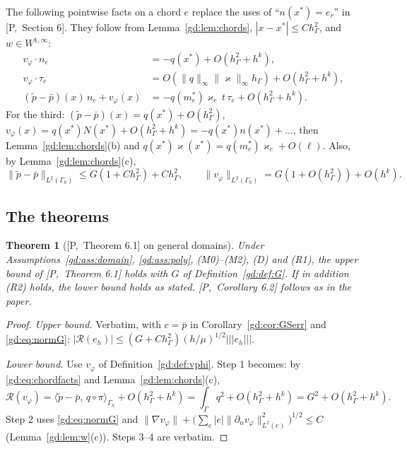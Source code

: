 \documentclass[11pt,reqno]{amsart}
\theoremstyle{plain}
\newtheorem{theorem}{Theorem}[section]
\theoremstyle{definition}
\newcommand{\hG}{h_\Gamma}
\newcommand{\Gh}{\Gamma_h}
\newcommand{\dn}{\partial_n}
\newcommand{\pt}{\tilde p}
\newcommand{\pbar}{\bar p}
\newcommand{\ip}[2]{\langle #1,\, #2\rangle}
\newcommand{\tnorm}[1]{|\!|\!|#1|\!|\!|}
\newcommand{\norm}[1]{\lVert #1\rVert}
\newcommand{\Rc}{\mathcal R}
\newcommand{\kap}{\varkappa}            %
\newcommand{\kapi}{\norm{\kap}_\infty}
\newcommand{\Pref}[1]{\textup{[P,~#1]}}
\begin{document}
The following pointwise facts on a chord $e$ replace the uses of ``$n(x^\ast)=e_r$'' in \Pref{Section 6}. They follow from Lemma~\ref{gd:lem:chords}, $|x-x^\ast|\le C\hG^2$, and $w\in W^{1,\infty}$:
\begin{equation}\label{gd:eq:chordfacts}
\begin{aligned}
v_\varphi\cdot n_e&=-q(x^\ast)+O(\hG^2+h^k),\\
v_\varphi\cdot\tau_e&=O(\norm q_\infty\kapi\hG)+O(\hG^2+h^k),\\
(\pt-\pbar)(x)\,n_e+v_\varphi(x)&=-q(m_e^\ast)\kap_e\,t\,\tau_e+O(\hG^2+h^k).
\end{aligned}
\end{equation}
For the third: $(\pt-\pbar)(x)=q(x^\ast)+O(\hG^2)$, $v_\varphi(x)=q(x^\ast)N(x^\ast)+O(\hG^2+h^k)=-q(x^\ast)n(x^\ast)+\dots$, then Lemma~\ref{gd:lem:chords}(b) and $q(x^\ast)\kap(x^\ast)=q(m_e^\ast)\kap_e+O(\ell)$. Also, by Lemma~\ref{gd:lem:chords}(c),
\begin{equation}\label{gd:eq:normG}
\norm{\pt-\pbar}_{L^2(\Gh)}\le G(1+C\hG^2)+C\hG^2,\qquad\norm{v_\varphi}_{L^2(\Gh)}=G(1+O(\hG^2))+O(h^k).
\end{equation}

\subsection{The theorems}
\begin{theorem}[\Pref{Theorem 6.1} on general domains]\label{gd:thm:A}
Under Assumptions~\ref{gd:ass:domain}, \ref{gd:ass:poly}, (M0)--(M2), (D) and (R1), the upper bound of \Pref{Theorem 6.1} holds with $G$ of Definition~\ref{gd:def:G}. If in addition (R2) holds, the lower bound holds as stated. \Pref{Corollary 6.2} follows as in the paper.
\end{theorem}

\begin{proof}
\emph{Upper bound.} Verbatim, with $c=\pbar$ in Corollary~\ref{gd:cor:GSerr} and \eqref{gd:eq:normG}: $|\Rc(e_h)|\le(G+C\hG^2)(h/\mu)^{1/2}\tnorm{e_h}$.

\emph{Lower bound.} Use $v_\varphi$ of Definition~\ref{gd:def:vphi}. Step 1 becomes: by \eqref{gd:eq:chordfacts} and Lemma~\ref{gd:lem:chords}(c),
\[
\Rc(v_\varphi)=\ip{\pt-\pbar}{q\circ\pi}_{\Gh}+O(\hG^2+h^k)=\int_\Gamma q^2+O(\hG^2+h^k)=G^2+O(\hG^2+h^k).
\]
Step 2 uses \eqref{gd:eq:normG} and $\norm{\nabla v_\varphi}+\bigl(\sum_e|e|\norm{\dn v_\varphi}_{L^2(e)}^2\bigr)^{1/2}\le C$ (Lemma~\ref{gd:lem:w}(c)). Steps 3--4 are verbatim.
\end{proof}
\end{document}

